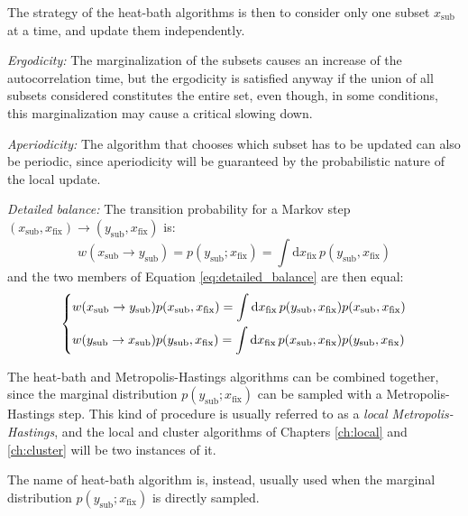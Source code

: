 The strategy of the heat-bath algorithms is then to consider only one subset $x_\mathrm{sub}$ at a time, and update them independently.

\begin{description}
    \item{\emph{Ergodicity:}} The marginalization of the subsets causes an increase of the autocorrelation time,
        but the ergodicity is satisfied anyway if the union of all subsets considered constitutes the entire set,
        even though, in some conditions, this marginalization may cause a critical slowing down.
    \item{\emph{Aperiodicity:}} The algorithm that chooses which subset has to be updated can also be periodic,
        since aperiodicity will be guaranteed by the probabilistic nature of the local update.
    \item{\emph{Detailed balance:}} The transition probability for a Markov step $(x_\mathrm{sub},x_\mathrm{fix})\to (y_\mathrm{sub},x_\mathrm{fix})$ is:
        \[
            w(x_\mathrm{sub}\to y_\mathrm{sub}) = p(y_\mathrm{sub};x_\mathrm{fix}) = \int\mathrm dx_\mathrm{fix}\,p(y_\mathrm{sub},x_\mathrm{fix})
        \]
        and the two members of Equation \eqref{eq:detailed_balance} are then equal:
        \[
            \begin{dcases}
                w(x_\mathrm{sub}\to y_\mathrm{sub})p(x_\mathrm{sub},x_\mathrm{fix}) = \int\mathrm dx_\mathrm{fix}\,p(y_\mathrm{sub},x_\mathrm{fix})p(x_\mathrm{sub},x_\mathrm{fix}) \\
                w(y_\mathrm{sub}\to x_\mathrm{sub})p(y_\mathrm{sub},x_\mathrm{fix}) = \int\mathrm dx_\mathrm{fix}\,p(x_\mathrm{sub},x_\mathrm{fix})p(y_\mathrm{sub},x_\mathrm{fix})
            \end{dcases}
        \]
\end{description}

The heat-bath and Metropolis-Hastings algorithms can be combined together,
since the marginal distribution $p(y_\mathrm{sub};x_\mathrm{fix})$ can be sampled with a Metropolis-Hastings step.
This kind of procedure is usually referred to as a \emph{local Metropolis-Hastings},
and the local and cluster algorithms of Chapters \ref{ch:local} and \ref{ch:cluster} will be two instances of it.

The name of heat-bath algorithm is, instead, usually used when the marginal distribution $p(y_\mathrm{sub};x_\mathrm{fix})$ is directly sampled.

